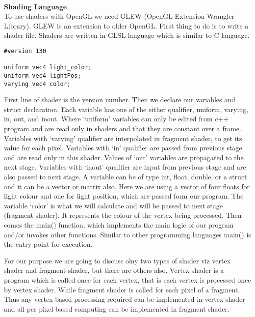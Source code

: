 \documentclass[11pt]{article}
\begin{document}
\noindent\\
\textbf{Shading Language}\\
To use shaders with OpenGL we need GLEW (OpenGL Extension Wrangler Library). GLEW is an extension to older OpenGL. First thing to do is to write a shader file. Shaders are written in GLSL language which is similar to C language.

\begin{lstlisting}
#version 130

uniform vec4 light_color;
uniform vec4 lightPos;
varying vec4 color;
\end{lstlisting}

First line of shader is the version number. Then we declare our variables and struct declaration. Each variable has one of the either qualifier, uniform, varying, in, out, and inout. Where `uniform' variables can only be edited from c++ program and are read only in shaders and that they are constant over a frame. Variables with `varying' qualifier are interpolated in fragment shader, to get its value for each pixel. Variables with `in' qualifier are passed from previous stage and are read only in this shader. Values of `out' variables are propagated to the next stage. Variables with `inout' qualifier are input from previous stage and are also passed to next stage. A variable can be of type int, float, double, or a struct and it can be a vector or matrix also. Here we are using a vector of four floats for light colour and one for light position, which are passed form our program. The variable `color' is what we will calculate and will be passed to next stage (fragment shader). It represents the colour of the vertex being processed. Then comes the main() function, which implements the main logic of our program and/or invokes other functions. Similar to other programming languages main() is the entry point for execution.

For our purpose we are going to discuss olny two types of shader viz vertex shader and fragment shader, but there are others also. Vertex shader is a program which is called once for each vertex, that is each vertex is processed once by vertex shader. While fragment shader is called for each pixel of a fragment. Thus any vertex based processing required can be implemented in vertex shader and all per pixel based computing can be implemented in fragment shader.
\end{document}
